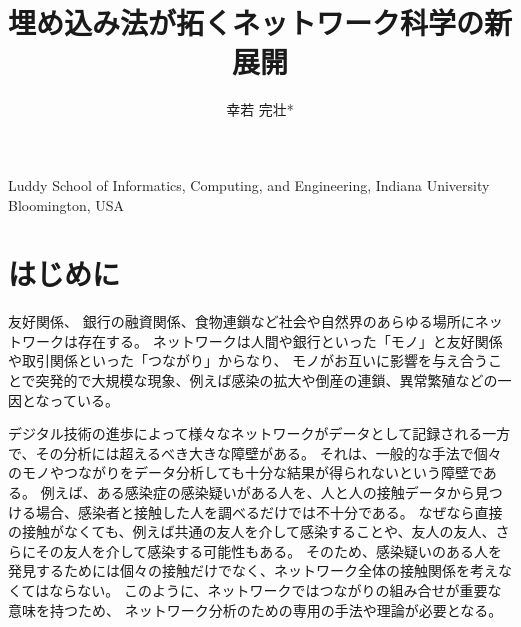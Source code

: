 \documentclass[J]{scitrans}
\begin{document}
\title{埋め込み法が拓くネットワーク科学の新展開}
\author{幸若 完壮*}


\maketitle


\address{*}{Luddy School of Informatics, Computing, and Engineering, Indiana University Bloomington, USA}


\section{はじめに}
\label{sec:introduction}

友好関係、 銀行の融資関係、食物連鎖など社会や自然界のあらゆる場所にネットワークは存在する。
ネットワークは人間や銀行といった「モノ」と友好関係や取引関係といった「つながり」からなり、 
モノがお互いに影響を与え合うことで突発的で大規模な現象、例えば感染の拡大や倒産の連鎖、異常繁殖などの一因となっている\cite{}。

デジタル技術の進歩によって様々なネットワークがデータとして記録される一方で、その分析には超えるべき大きな障壁がある。
それは、一般的な手法で個々のモノやつながりをデータ分析しても十分な結果が得られないという障壁である。
例えば、ある感染症の感染疑いがある人を、人と人の接触データから見つける場合、感染者と接触した人を調べるだけでは不十分である。
なぜなら直接の接触がなくても、例えば共通の友人を介して感染することや、友人の友人、さらにその友人を介して感染する可能性もある。
そのため、感染疑いのある人を発見するためには個々の接触だけでなく、ネットワーク全体の接触関係を考えなくてはならない。
このように、ネットワークではつながりの組み合せが重要な意味を持つため、 ネットワーク分析のための専用の手法や理論が必要となる。
\end{document}
